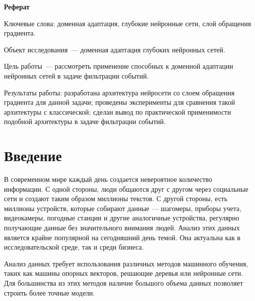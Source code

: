 \documentclass[14pt, a4paper]{extarticle}
\begin{document}
\sloppy

\newpage

\setcounter{page}{1}
\thispagestyle{empty}

\centerline{\large \textbf{Реферат}}

\bigskip
\bigskip

\noindent
Ключевые слова: доменная адаптация, глубокие нейронные сети, слой обращения градиента.

\medskip 

\noindent
Объект исследования~— доменная адаптация глубоких нейронных сетей.

\medskip 

\noindent
Цель работы~— рассмотреть применение способных к доменной адаптации нейронных сетей в задаче фильтрации событий.

\medskip 

\noindent
Результаты работы: разработана архитектура нейросети со слоем обращения градиента для данной задачи; проведены эксперименты для сравнения такой архитектуры с классической; сделан вывод по практической применимости подобной архитектуры в задаче фильтрации событий.

\newpage

\tableofcontents

\newpage

\section*{Введение}

В современном мире каждый день создается невероятное количество информации. С одной стороны, люди общаются друг с другом через социальные сети и создают таким образом миллионы текстов. С другой стороны, есть миллионы устройств, которые собирают данные — шагомеры, приборы учета, видеокамеры, погодные станции и другие аналогичные устройства, регулярно получающие данные без значительного внимания людей. Анализ этих данных является крайне популярной на сегодняшний день темой. Она актуальна как в исследовательской среде, так и среди бизнеса. 

Анализ данных требует использования различных методов машинного обучения, таких как машины опорных векторов, решающие деревья или нейронные сети. Для большинства из этих методов наличие большого объема данных позволяет строить более точные модели. 
\end{document}

